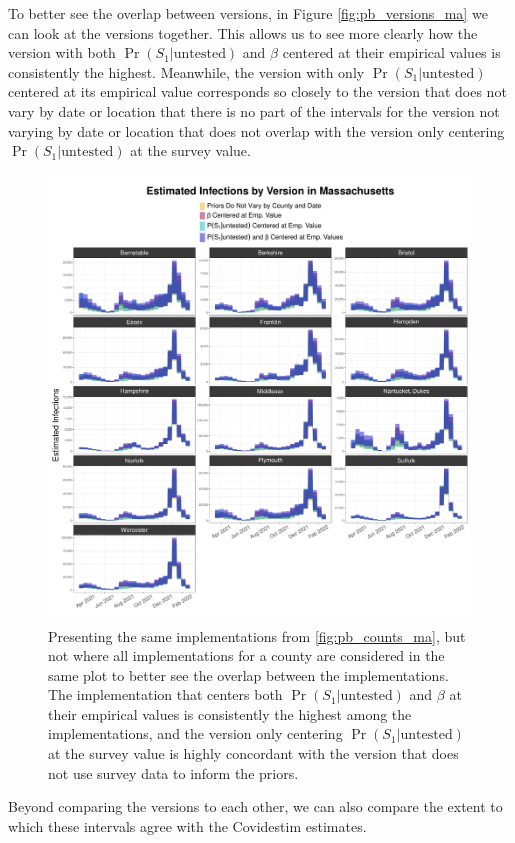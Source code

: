 \documentclass[12pt,twoside]{smiththesis}
\begin{document}
To better see the overlap between versions, in Figure \ref{fig:pb_versions_ma} we can look at the versions together. This allows us to see more clearly how the version with both \(\Pr(S_1|\text{untested})\) and \(\beta\) centered at their empirical values is consistently the highest. Meanwhile, the version with only \(\Pr(S_1|\text{untested})\) centered at its empirical value corresponds so closely to the version that does not vary by date or location that there is no part of the intervals for the version not varying by date or location that does not overlap with the version only centering \(\Pr(S_1|\text{untested})\) at the survey value.
\begin{figure}
\includegraphics[width=1\linewidth]{figure/ma_pb_compare_versions} \caption{\label{fig:pb_versions_ma} Presenting the same implementations from \ref{fig:pb_counts_ma}, but not where all implementations for a county are considered in the same plot to better see the overlap between the implementations. The implementation that centers both $\Pr(S_1|\text{untested})$ and $\beta$ at their empirical values is consistently the highest among the implementations, and the version only centering $\Pr(S_1|\text{untested})$ at the survey value is highly concordant with the version that does not use survey data to inform the priors.}\label{fig:unnamed-chunk-79}
\end{figure}
Beyond comparing the versions to each other, we can also compare the extent to which these intervals agree with the Covidestim estimates.
\end{document}
